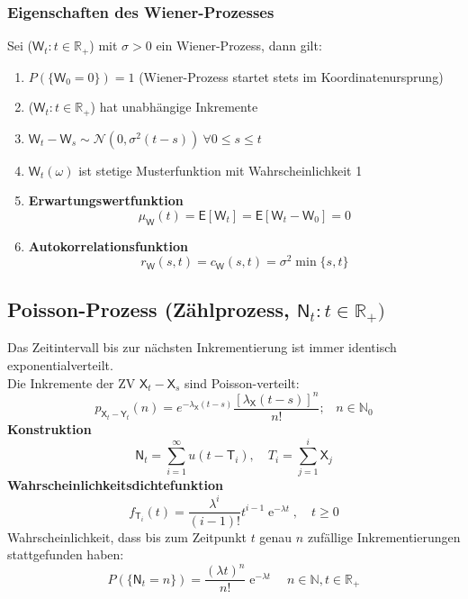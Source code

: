 \documentclass[a4paper,twocolumn,10pt]{article}
\newenvironment{abc}{\begin{enumerate}[label={\alph*)}]}{\end{enumerate}}
\newcommand{\erw}{\mathsf{E}}
\begin{document}
\subsubsection{Eigenschaften des Wiener-Prozesses}
Sei  ($\mathsf{W}_{t} : t \in \mathbb{R}_{+}$) mit $\sigma > 0$ ein Wiener-Prozess, dann gilt:
\begin{abc}
\item $P(\{\mathsf{W}_{0} = 0 \}) = 1$ (Wiener-Prozess startet stets im Koordinatenursprung)
\item ($\mathsf{W}_{t} : t \in \mathbb{R}_{+}$) hat unabhängige Inkremente
\item $\mathsf{W}_{t} - \mathsf{W}_{s} \sim \mathcal{N} (0, \sigma^{2}(t-s)) \ \forall 0 \leq s \leq t$
\item $\mathsf{W}_{t}(\omega)$ ist stetige Musterfunktion mit Wahrscheinlichkeit 1
\item \textbf{Erwartungswertfunktion}
\[ \mu_{\mathsf{W}}(t) = \erw[\mathsf{W}_{t}] = \erw[\mathsf{W}_{t} - \mathsf{W}_{0}] = 0\]
\item \textbf{Autokorrelationsfunktion}
\[r_{\mathsf{W}}(s,t) = c_{\mathsf{W}}(s,t) = \sigma^{2} \operatorname{min}\{s,t\} \]
\end{abc}

\subsection{Poisson-Prozess (\textbf{Zählprozess}, $\mathsf{N}_{t} : t \in \mathbb{R}_{+})$}
Das Zeitintervall bis zur nächsten Inkrementierung ist immer identisch exponentialverteilt.\\
Die Inkremente der ZV $\mathsf{X}_t-\mathsf{X}_s$ sind Poisson-verteilt:
\[p_{\mathsf{X}_t-\mathsf{Y}_t}(n)=e^{-\lambda_\mathsf{X}(t-s)}\frac{[\lambda_\mathsf{X}(t-s)]^n}{n!};\;\;\;n\in\mathbb{N}_0\]
\textbf{Konstruktion}
\[ \mathsf{N}_{t} = \sum \limits_{i = 1}^{\infty} u(t - \mathsf{T}_{i}), \quad T_{i} = \sum \limits_{j=1}^{i} \mathsf{X}_{j}\]
\textbf{Wahrscheinlichkeitsdichtefunktion}
\[ f_{\mathsf{T}_{i}}(t) = \frac{\lambda^{i}}{(i-1)!} t^{i-1}\operatorname{e}^{-\lambda t}, \quad t \geq 0\]
Wahrscheinlichkeit, dass bis zum Zeitpunkt $t$ genau $n$ zufällige Inkrementierungen stattgefunden haben:
\[ P(\{\mathsf{N}_{t} = n \}) = \frac{(\lambda t)^{n}}{n!} \operatorname{e}^{-\lambda t} \quad n \in \mathbb{N}, t \in \mathbb{R}_{+}\]
\end{document}
